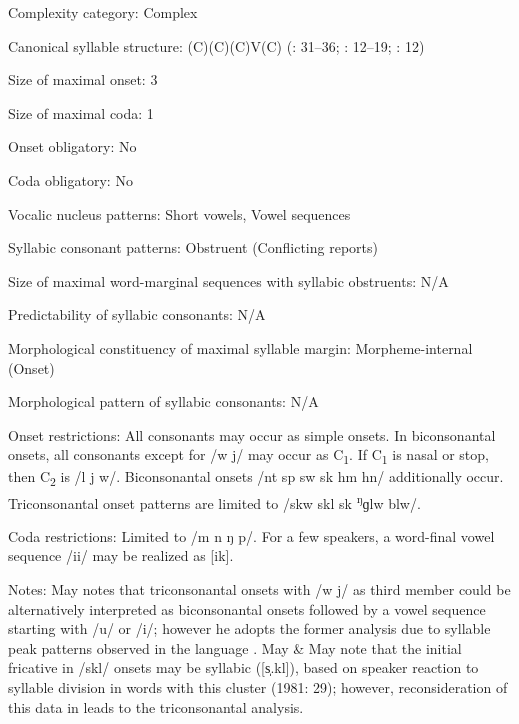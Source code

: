 {\begin{appendixdesc}
\item[Complexity category:] Complex

\item[Canonical syllable structure:] (C)(C)(C)V(C) (\citealt{Anceaux1965}: 31--36; \citealt{May1997}: 12--19; \citealt{MayMay1981}: 12)

\item[Size of maximal onset:] 3

\item[Size of maximal coda:] 1

\item[Onset obligatory:] No

\item[Coda obligatory:] No

\item[Vocalic nucleus patterns:] Short vowels, Vowel sequences

\item[Syllabic consonant patterns:] Obstruent (Conflicting reports)

\item[Size of maximal word-marginal sequences with syllabic obstruents:] N/A

\item[Predictability of syllabic consonants:] N/A

\item[Morphological constituency of maximal syllable margin:] Morpheme-internal (Onset)

\item[Morphological pattern of syllabic consonants:] N/A

\item[Onset restrictions:] All consonants may occur as simple onsets. In biconsonantal onsets, all consonants except for /w j/ may occur as C\textsubscript{1}. If C\textsubscript{1} is nasal or stop, then C\textsubscript{2} is /l j w/. Biconsonantal onsets /nt sp sw sk hm hn/ additionally occur. Triconsonantal onset patterns are limited to /skw skl sk \textsuperscript{ŋ}ɡlw blw/.

\item[Coda restrictions:] Limited to /m n ŋ p/. For a few speakers, a word-final vowel sequence /ii/ may be realized as [ik].

\item[Notes:] May notes that triconsonantal onsets with /w j/ as third member could be alternatively interpreted as biconsonantal onsets followed by a vowel sequence starting with /u/ or /i/; however he adopts the former analysis due to syllable peak patterns observed in the language \citep[17--18]{May1997}. May \& May note that the initial fricative in /skl/ onsets may be syllabic ([s̩.kl]), based on speaker reaction to syllable division in words with this cluster (1981: 29); however, reconsideration of this data in \citet{May1997} leads to the triconsonantal analysis.
\end{appendixdesc}
}
